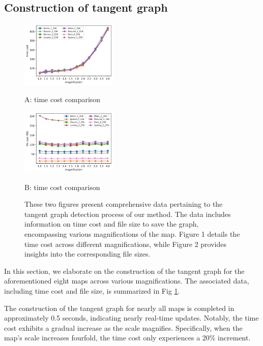 \documentclass[letterpaper, 10 pt, journal, twoside]{IEEEtran}
\begin{document}
\subsection{Construction of tangent graph}

\begin{figure}[t] \scriptsize
\begin{minipage}{.48\linewidth}
  \centerline{\includegraphics[width=4.6cm]{pre_time_cost.png}}
  \centerline{A: time cost comparison}
\end{minipage}
\hfill
\begin{minipage}{.48\linewidth}
  \centerline{\includegraphics[width=4.6cm]{pre_file_size.png}}
  \centerline{B: time cost comparison}
\end{minipage}
\vfill

\caption{These two figures present comprehensive data pertaining to the tangent graph detection process of our method. The data includes information on time cost and file size to save the graph, encompassing various magnifications of the map. Figure 1 details the time cost across different magnifications, while Figure 2 provides insights into the corresponding file sizes.}
\label{precomputation_data}
\end{figure}

In this section, we elaborate on the construction of the tangent graph for the aforementioned eight maps across various magnifications. The associated data, including time cost and file size, is summarized in Fig \ref{precomputation_data}.

The construction of the tangent graph for nearly all maps is completed in approximately 0.5 seconds, indicating nearly real-time updates. Notably, the time cost exhibits a gradual increase as the scale magnifies. Specifically, when the map's scale increases fourfold, the time cost only experiences a 20\% increment.
\end{document}
